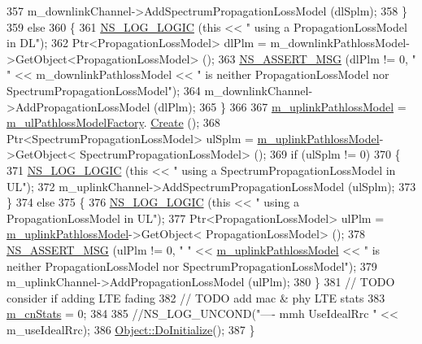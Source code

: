 \begin{DoxyCode}
357           m\_downlinkChannel->AddSpectrumPropagationLossModel (dlSplm);
358         \}
359         \textcolor{keywordflow}{else}
360         \{
361           \hyperlink{group__logging_ga88acd260151caf2db9c0fc84997f45ce}{NS\_LOG\_LOGIC} (\textcolor{keyword}{this} << \textcolor{stringliteral}{" using a PropagationLossModel in DL"});
362           Ptr<PropagationLossModel> dlPlm = m\_downlinkPathlossModel->GetObject<PropagationLossModel> ();
363           \hyperlink{assert_8h_aff5ece9066c74e681e74999856f08539}{NS\_ASSERT\_MSG} (dlPlm != 0, \textcolor{stringliteral}{" "} << m\_downlinkPathlossModel << \textcolor{stringliteral}{" is neither
       PropagationLossModel nor SpectrumPropagationLossModel"});
364           m\_downlinkChannel->AddPropagationLossModel (dlPlm);
365         \}
366 
367         \hyperlink{classns3_1_1MmWaveHelper_a13bd21e36e3ef9f3c11aeca4eef3fc36}{m\_uplinkPathlossModel} = \hyperlink{classns3_1_1MmWaveHelper_a566de690e8d9c30e5b97335caf3fb16a}{m\_ulPathlossModelFactory}.
      \hyperlink{classns3_1_1ObjectFactory_a18152e93f0a6fe184ed7300cb31e9896}{Create} ();
368         Ptr<SpectrumPropagationLossModel> ulSplm = \hyperlink{classns3_1_1MmWaveHelper_a13bd21e36e3ef9f3c11aeca4eef3fc36}{m\_uplinkPathlossModel}->GetObject<
      SpectrumPropagationLossModel> ();
369         \textcolor{keywordflow}{if} (ulSplm != 0)
370         \{
371           \hyperlink{group__logging_ga88acd260151caf2db9c0fc84997f45ce}{NS\_LOG\_LOGIC} (\textcolor{keyword}{this} << \textcolor{stringliteral}{" using a SpectrumPropagationLossModel in UL"});
372           m\_uplinkChannel->AddSpectrumPropagationLossModel (ulSplm);
373         \}
374         \textcolor{keywordflow}{else}
375         \{
376           \hyperlink{group__logging_ga88acd260151caf2db9c0fc84997f45ce}{NS\_LOG\_LOGIC} (\textcolor{keyword}{this} << \textcolor{stringliteral}{" using a PropagationLossModel in UL"});
377           Ptr<PropagationLossModel> ulPlm = \hyperlink{classns3_1_1MmWaveHelper_a13bd21e36e3ef9f3c11aeca4eef3fc36}{m\_uplinkPathlossModel}->GetObject<
      PropagationLossModel> ();
378           \hyperlink{assert_8h_aff5ece9066c74e681e74999856f08539}{NS\_ASSERT\_MSG} (ulPlm != 0, \textcolor{stringliteral}{" "} << \hyperlink{classns3_1_1MmWaveHelper_a13bd21e36e3ef9f3c11aeca4eef3fc36}{m\_uplinkPathlossModel} << \textcolor{stringliteral}{" is
       neither PropagationLossModel nor SpectrumPropagationLossModel"});
379           m\_uplinkChannel->AddPropagationLossModel (ulPlm);
380         \}
381         \textcolor{comment}{// TODO consider if adding LTE fading}
382         \textcolor{comment}{// TODO add mac & phy LTE stats}
383         \hyperlink{classns3_1_1MmWaveHelper_a87bf8cd5b307fe0037ddf510920211dd}{m\_cnStats} = 0;
384 
385         \textcolor{comment}{//NS\_LOG\_UNCOND("---- mmh UseIdealRrc " << m\_useIdealRrc);}
386         \hyperlink{classns3_1_1Object_af8482a521433409fb5c7f749398c9dbe}{Object::DoInitialize}();
387 \}
\end{DoxyCode}


